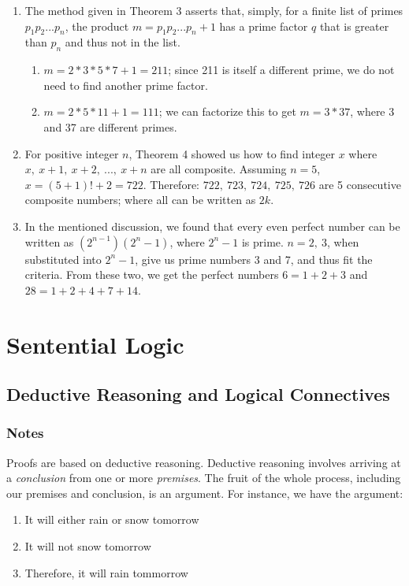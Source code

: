 \documentclass[a4paper, 11pt]{article}
\begin{document}
\begin{enumerate}
  \item The method given in Theorem 3 asserts that, simply, for a finite list of primes $p_1p_2...p_n$, the product $m=p_1p_2...p_n + 1$ has a prime factor $q$ that is greater than $p_n$ and thus not in the list.
        \begin{enumerate}
          \item $m=2*3*5*7+1 = 211$; since 211 is itself a different prime, we do not need to find another prime factor.
          \item $m=2*5*11+1=111$; we can factorize this to get $m=3*37$, where 3 and 37 are different primes.
        \end{enumerate}

  \item For positive integer $n$, Theorem 4 showed us how to find integer $x$ where $x, ~x+1, ~x+2,~...,~x+n$  are all composite. Assuming $n=5$, $x=(5+1)!+2=722$. Therefore: $722, ~723, ~724, ~725, ~726$ are 5 consecutive composite numbers; where all can be written as $2k$.

  \item In the mentioned discussion, we found that every even perfect number can be written as $(2^{n-1})(2^n-1)$, where $2^n-1$ is prime. $n=2, ~3$, when substituted into $2^n-1$, give us prime numbers 3 and 7, and thus fit the criteria. From these two, we get the perfect numbers $6=1+2+3$ and $28=1+2+4+7+14$.

\end{enumerate}
\clearpage

\section{Sentential Logic}
\subsection{Deductive Reasoning and Logical Connectives}
\subsubsection{Notes}

Proofs are based on deductive reasoning. Deductive reasoning involves arriving at a \textit{conclusion} from one or more \textit{premises}. The fruit of the whole process, including our premises and conclusion, is an argument. For instance, we have the argument:

\begin{enumerate}
  \item It will either rain or snow tomorrow
  \item It will not snow tomorrow
  \item Therefore, it will rain tommorrow
\end{enumerate}
\end{document}
